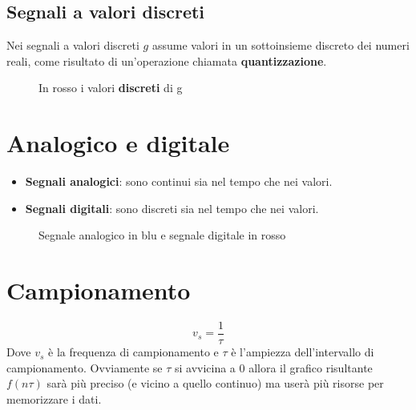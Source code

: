 \documentclass[12pt, a4paper]{report}
\begin{document}
\subsection{Segnali a valori discreti}
Nei segnali a valori discreti $g$ assume valori in un sottoinsieme discreto dei numeri reali, come risultato di un'operazione chiamata \textbf{quantizzazione}.
\begin{figure}[h!]
    \centering
    \caption{In rosso i valori \textbf{discreti} di g}
\end{figure}
\section{Analogico e digitale}
\begin{itemize}
    \item \textbf{Segnali analogici}: sono continui sia nel tempo che nei valori.
    \item \textbf{Segnali digitali}: sono discreti sia nel tempo che nei valori.
\end{itemize}
\begin{figure}[h!]
    \centering
    \caption{Segnale analogico in blu e segnale digitale in rosso}
\end{figure}
\section{Campionamento}
\begin{equation*}
    v_{s} = \frac{1}{\tau}
\end{equation*}
Dove $v_{s}$ è la frequenza di campionamento e $\tau$ è l'ampiezza dell'intervallo di campionamento. Ovviamente se $\tau$ si avvicina a 0 allora il grafico risultante $f(n\tau)$ sarà più preciso (e vicino a quello continuo) ma userà più risorse per memorizzare i dati.
\end{document}
